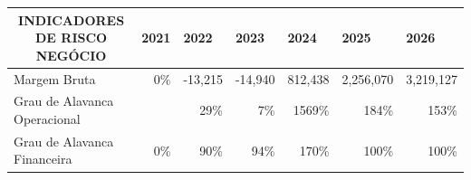 \documentclass[11pt]{article}
\begin{document}
\begin{adjustbox}{center}
\begin{tabular}{|l|r|r|r|r|r|r|}
			\multicolumn{1}{|c|}{INDICADORES DE RISCO NEGÓCIO}         & \multicolumn{1}{l|}{2021} & \multicolumn{1}{l|}{2022} & \multicolumn{1}{l|}{2023} & \multicolumn{1}{l|}{2024} & \multicolumn{1}{l|}{2025} & \multicolumn{1}{l|}{2026} \\ \hline
			Margem Bruta                                               & 0\%                       & -13,215                   & -14,940                   & 812,438                   & 2,256,070                 & 3,219,127                 \\ \hline
			Grau de Alavanca Operacional                               &                           & 29\%                      & 7\%                       & 1569\%                    & 184\%                     & 153\%                     \\ \hline
			Grau de Alavanca Financeira                                & 0\%                       & 90\%                      & 94\%                      & 170\%                     & 100\%                     & 100\%                     \\ \hline
		\end{tabular}
	\end{adjustbox}

	\pagebreak

	\listoffigures
\end{document}
